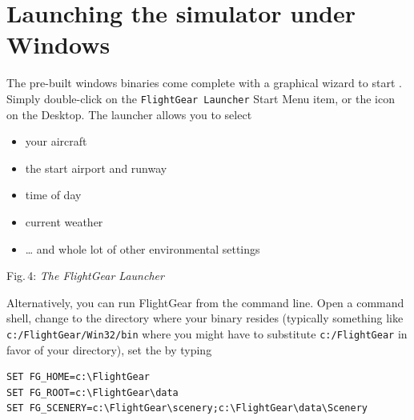 \section{Launching the simulator under Windows}
The pre-built windows binaries come complete with a graphical wizard to start \FlightGear{}. Simply double-click on the \texttt{FlightGear Launcher} Start Menu item, or the icon on the Desktop. The launcher allows you to select
\begin{itemize}
\item your aircraft
\item the start airport and runway
\item time of day
\item current weather
\item \dots{} and whole lot of other environmental settings
\end{itemize}

 \centerline{}
\smallskip

 \noindent
Fig.\,4: \textit{The FlightGear Launcher}
\medskip

Alternatively, you can run FlightGear from the command line. Open
a command shell, change to the directory where your binary resides
(typically something like \texttt{c:/FlightGear/Win32/bin} where you might have to substitute
\texttt{c:/FlightGear} in favor of your \FlightGear{} directory), set the  by typing 
\medskip

\begin{verbatim}
SET FG_HOME=c:\FlightGear
SET FG_ROOT=c:\FlightGear\data
SET FG_SCENERY=c:\FlightGear\scenery;c:\FlightGear\data\Scenery
\end{verbatim}
\medskip


